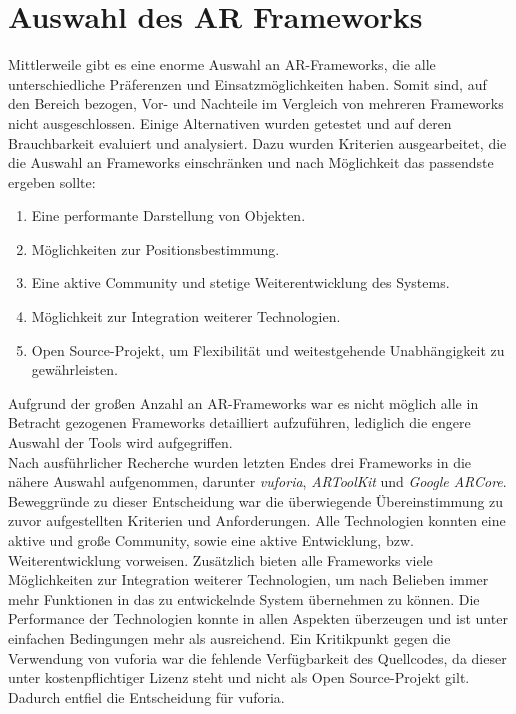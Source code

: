 \section{Auswahl des AR Frameworks}
\label{chap:Auswahl des AR Frameworks}
Mittlerweile gibt es eine enorme Auswahl an \acs{AR}-Frameworks, die alle unterschiedliche Präferenzen und 
Einsatzmöglichkeiten haben. Somit sind, auf den Bereich bezogen, Vor- und Nachteile im Vergleich von mehreren Frameworks nicht ausgeschlossen. 
Einige Alternativen wurden getestet und auf deren Brauchbarkeit evaluiert und analysiert. Dazu wurden Kriterien ausgearbeitet, die die 
Auswahl an Frameworks einschränken und nach Möglichkeit das passendste ergeben sollte: 
\pagebreak
\begin{enumerate}
    \item Eine performante Darstellung von Objekten.
    \item Möglichkeiten zur Positionsbestimmung.
    \item Eine aktive Community und stetige Weiterentwicklung des Systems.
    \item Möglichkeit zur Integration weiterer Technologien.
    \item Open Source-Projekt, um Flexibilität und weitestgehende Unabhängigkeit zu gewährleisten.
\end{enumerate}
Aufgrund der großen Anzahl an \acs{AR}-Frameworks war es nicht möglich alle in Betracht gezogenen Frameworks detailliert aufzuführen, 
lediglich die engere Auswahl der Tools wird aufgegriffen. 
\\ 
Nach ausführlicher Recherche wurden letzten Endes drei Frameworks in die nähere Auswahl aufgenommen, darunter \textit{vuforia}, 
\textit{ARToolKit} und \textit{Google ARCore}. Beweggründe zu dieser Entscheidung war die überwiegende 
Übereinstimmung zu zuvor aufgestellten Kriterien und Anforderungen. Alle Technologien konnten eine aktive und große Community, sowie eine 
aktive Entwicklung, bzw. Weiterentwicklung vorweisen. Zusätzlich bieten alle Frameworks viele Möglichkeiten zur Integration weiterer 
Technologien, um nach Belieben immer mehr Funktionen in das zu entwickelnde System übernehmen zu können. Die Performance der Technologien konnte 
in allen Aspekten überzeugen und ist unter einfachen Bedingungen mehr als ausreichend. Ein Kritikpunkt gegen die Verwendung von vuforia war 
die fehlende Verfügbarkeit des Quellcodes, da dieser unter kostenpflichtiger Lizenz steht und nicht als Open Source-Projekt gilt. Dadurch 
entfiel die Entscheidung für vuforia.

